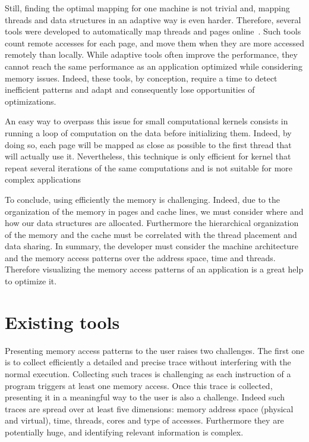 Still, finding the optimal mapping for one machine is not trivial and, mapping threads and data structures in an adaptive way is even harder.
Therefore, several tools were developed to automatically map threads and pages online~\cite{Diener14kMAF,Corbet12Toward}.
Such tools count remote accesses for each page, and move them when they are more accessed remotely than locally.
While adaptive tools often improve the performance, they cannot reach the same performance as an application optimized while considering memory issues.
Indeed, these tools, by conception, require a time to detect inefficient patterns and adapt and consequently lose opportunities of optimizations.

An easy way to overpass this issue for small computational kernels consists in running a loop of computation on the data before initializing them.
Indeed, by doing so, each page will be mapped as close as possible to the first thread that will actually use it.
Nevertheless, this technique is only efficient for kernel that repeat several iterations of the same computations and is not suitable for more complex applications

To conclude, using efficiently the memory is challenging.
Indeed, due to the organization of the memory in pages and cache lines, we must consider where and how our data structures are allocated.
Furthermore the hierarchical organization of the memory and the cache must be correlated with the thread placement and data sharing.
In summary, the developer must consider the machine architecture and the memory access patterns over the address space, time and threads.
Therefore visualizing the memory access patterns of an application is a great help to optimize it.

\section{Existing tools}
\label{sec:mem-tools}

Presenting memory access patterns to the user raises two challenges.
The first one is to collect efficiently a detailed and precise trace without interfering with the normal execution.
Collecting such traces is challenging as each instruction of a program triggers at least one memory access.
Once this trace is collected, presenting it in a meaningful way to the user is also a challenge.
Indeed such traces are spread over at least five dimensions: memory address space (physical and virtual), time, threads, cores and type of accesses.
Furthermore they are potentially huge, and identifying relevant information is complex.

